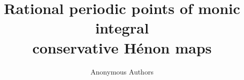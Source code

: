 \documentclass[11pt]{article}
\title{Rational periodic points of monic integral\protect\\
conservative H\'enon maps}
\author{Anonymous Authors}
\date{}
\begin{document}
\maketitle
\begin{abstract}

\end{abstract}







\clearpage
\appendix



\end{document}
